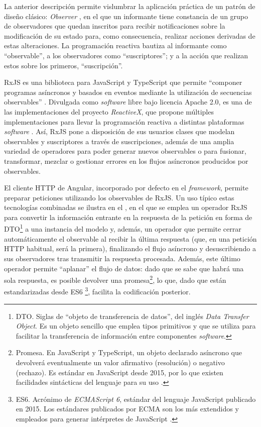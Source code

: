 La anterior descripción permite vislumbrar la aplicación práctica de un patrón de diseño clásico: \textit{Observer} \cite{GammaObserver}, en el que un informante tiene constancia de un grupo de observadores que quedan inscritos para recibir notificaciones sobre la modificación de su estado para, como consecuencia, realizar acciones derivadas de estas alteraciones. La programación reactiva bautiza al informante como ``observable'', a los observadores como ``suscriptores''; y a la acción que realizan estos sobre los primeros, ``suscripción''.

RxJS es una biblioteca para JavaScript y TypeScript que permite ``componer programas asíncronos y basados en eventos mediante la utilización de secuencias observables'' \cite{RxJS}. Divulgada como \textit{software} libre bajo licencia Apache 2.0, es una de las implementaciones del proyecto \textit{ReactiveX}, que propone múltiples implementaciones para llevar la programación reactiva a distintas plataformas \textit{software} \cite{ReactiveX}. Así, RxJS pone a disposición de sus usuarios clases que modelan observables y suscriptores a través de suscripciones, además de una amplia variedad de operadores para poder generar nuevos observables o para fusionar, transformar, mezclar o gestionar errores en los flujos asíncronos producidos por observables.

El cliente HTTP de Angular, incorporado por defecto en el \textit{framework}, permite preparar peticiones utilizando los observables de RxJS. Un uso típico estas tecnologías combinadas se ilustra en el , en el que se emplea un operador RxJS para convertir la información entrante en la respuesta de la petición en forma de DTO\footnote{DTO. Siglas de ``objeto de transferencia de datos'', del inglés \textit{Data Transfer Object}. Es un objeto sencillo que emplea tipos primitivos y que se utiliza para facilitar la transferencia de información entre componentes \textit{software}.} a una instancia del modelo y, además, un operador que permite cerrar automáticamente el observable al recibir la última respuesta (que, en una petición HTTP habitual, será la primera), finalizando el flujo asíncrono y desuscribiendo a sus observadores tras transmitir la respuesta procesada. Además, este último operador permite ``aplanar'' el flujo de datos: dado que se sabe que habrá una sola respuesta, es posible devolver una promesa\footnote{Promesa. En JavaScript y TypeScript, un objeto declarado asíncrono que devolverá eventualmente un valor afirmativo (resolución) o negativo (rechazo). Es estándar en JavaScript desde 2015, por lo que existen facilidades sintácticas del lenguaje para su uso \cite{Promise}.}, lo que, dado que están estandarizadas desde ES6 \footnote{ES6. Acrónimo de \textit{ECMAScript 6}, estándar del lenguaje JavaScript publicado en 2015. Los estándares publicados por ECMA son los más extendidos y empleados para generar intérpretes de JavaScript \cite{ES6}.}, facilita la codificación posterior.

